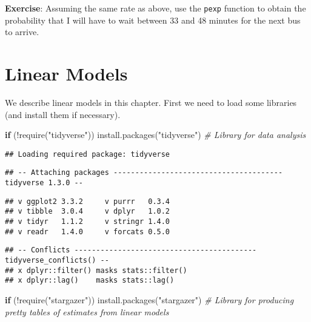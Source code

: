 \documentclass[
]{book}
\newenvironment{Shaded}{\begin{snugshade}}{\end{snugshade}}
\newcommand{\CommentTok}[1]{\textcolor[rgb]{0.56,0.35,0.01}{\textit{#1}}}
\newcommand{\ControlFlowTok}[1]{\textcolor[rgb]{0.13,0.29,0.53}{\textbf{#1}}}
\newcommand{\FunctionTok}[1]{\textcolor[rgb]{0.00,0.00,0.00}{#1}}
\newcommand{\NormalTok}[1]{#1}
\newcommand{\SpecialCharTok}[1]{\textcolor[rgb]{0.00,0.00,0.00}{#1}}
\newcommand{\StringTok}[1]{\textcolor[rgb]{0.31,0.60,0.02}{#1}}
\begin{document}
\textbf{Exercise}: Assuming the same rate as above, use the \texttt{pexp} function to obtain the probability that I will have to wait between 33 and 48 minutes for the next bus to arrive.

\hypertarget{linear-models}{%
\chapter{Linear Models}\label{linear-models}}

We describe linear models in this chapter. First we need to load some libraries (and install them if necessary).

\begin{Shaded}
\begin{Highlighting}[]
\ControlFlowTok{if}\NormalTok{ (}\SpecialCharTok{!}\FunctionTok{require}\NormalTok{(}\StringTok{"tidyverse"}\NormalTok{)) }\FunctionTok{install.packages}\NormalTok{(}\StringTok{"tidyverse"}\NormalTok{) }\CommentTok{\# Library for data analysis}
\end{Highlighting}
\end{Shaded}

\begin{verbatim}
## Loading required package: tidyverse
\end{verbatim}

\begin{verbatim}
## -- Attaching packages --------------------------------------- tidyverse 1.3.0 --
\end{verbatim}

\begin{verbatim}
## v ggplot2 3.3.2     v purrr   0.3.4
## v tibble  3.0.4     v dplyr   1.0.2
## v tidyr   1.1.2     v stringr 1.4.0
## v readr   1.4.0     v forcats 0.5.0
\end{verbatim}

\begin{verbatim}
## -- Conflicts ------------------------------------------ tidyverse_conflicts() --
## x dplyr::filter() masks stats::filter()
## x dplyr::lag()    masks stats::lag()
\end{verbatim}

\begin{Shaded}
\begin{Highlighting}[]
\ControlFlowTok{if}\NormalTok{ (}\SpecialCharTok{!}\FunctionTok{require}\NormalTok{(}\StringTok{"stargazer"}\NormalTok{)) }\FunctionTok{install.packages}\NormalTok{(}\StringTok{"stargazer"}\NormalTok{) }\CommentTok{\# Library for producing pretty tables of estimates from linear models}
\end{Highlighting}
\end{Shaded}
\end{document}
